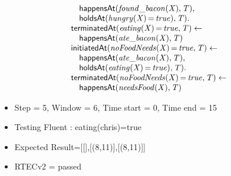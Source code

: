 \documentclass[8pt]{beamer}
\DeclareMathOperator{\val}{=}  %
\def \patsize {}
\def\happensAt{\textsf{\patsize happensAt}}
\def\holdsAt{\textsf{\patsize holdsAt}}
\def\initiatedAt{\textsf{\patsize initiatedAt}}
\def\terminatedAt{\textsf{\patsize terminatedAt}}
\newenvironment{mysplit}%
  {\arraycolsep 0pt \begin{array}{l}}%
  {\end{array}}
\begin{document}
\begin{frame}
\begin{minipage}{0.55\linewidth}
\begin{align*}
\begin{mysplit}
                \quad    \happensAt\mathit{(found\_bacon(X),T),}\\
                \quad    \holdsAt\mathit{(hungry(X)\val true),T).}\\
                \terminatedAt\mathit{(eating(X)\val true,T)\leftarrow}\\
                \quad    \happensAt\mathit{(ate\_bacon(X),T)}\\
                \initiatedAt\mathit{(noFoodNeeds(X)\val true,T)\leftarrow}\\
                \quad    \happensAt\mathit{(ate\_bacon(X),T),}\\
                \quad    \holdsAt\mathit{(eating(X)\val true),T).}\\
                \terminatedAt\mathit{(noFoodNeeds(X)\val true,T)\leftarrow}\\
                \quad    \happensAt\mathit{(needsFood(X),T)}\\
            \end{mysplit}
        \end{align*}
    \end{minipage}
    \begin{itemize}
        \item  Step = 5, Window = 6, Time start = 0, Time end = 15
        \item Testing Fluent :  eating(chris)=true
        \item Expected Result=[[],[(8,11)],[(8,11)]]
        \item RTECv2 = passed
    \end{itemize}
\end{frame}
\end{document}
